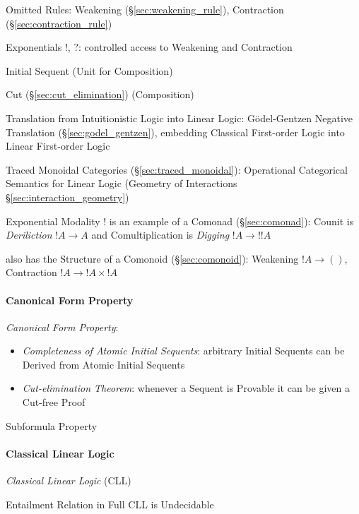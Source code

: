 Omitted Rules: Weakening (\S\ref{sec:weakening_rule}), Contraction
(\S\ref{sec:contraction_rule})

Exponentials $!$, $?$: controlled access to Weakening and Contraction

Initial Sequent (Unit for Composition)

Cut (\S\ref{sec:cut_elimination}) (Composition)

Translation from Intuitionistic Logic into Linear Logic:
G\"odel-Gentzen Negative Translation (\S\ref{sec:godel_gentzen}),
embedding Classical First-order Logic into Linear First-order Logic

Traced Monoidal Categories (\S\ref{sec:traced_monoidal}): Operational
Categorical Semantics for Linear Logic (Geometry of Interactions
\S\ref{sec:interaction_geometry})

Exponential Modality $!$ is an example of a Comonad
(\S\ref{sec:comonad}): Counit is \emph{Deriliction} $!A \rightarrow A$
and Comultiplication is \emph{Digging} $!A \rightarrow !!A$

also has the Structure of a Comonoid (\S\ref{sec:comonoid}): Weakening
$!A \rightarrow ()$, Contraction $!A \rightarrow !A \times !A$



\paragraph{Canonical Form Property}\label{sec:canonical_form_property}\hfill

\emph{Canonical Form Property}:
\begin{itemize}
  \item \emph{Completeness of Atomic Initial Sequents}: arbitrary
    Initial Sequents can be Derived from Atomic Initial Sequents
  \item \emph{Cut-elimination Theorem}: whenever a Sequent is Provable
    it can be given a Cut-free Proof
\end{itemize}

Subformula Property



\paragraph{Classical Linear Logic}\label{sec:cll} \hfill

\emph{Classical Linear Logic} (CLL)

Entailment Relation in Full CLL is Undecidable

